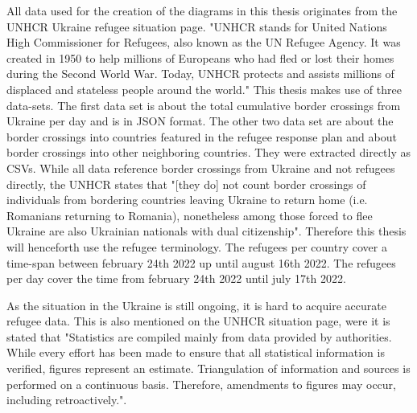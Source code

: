 All data used for the creation of the diagrams in this thesis originates from the UNHCR Ukraine refugee situation page\cite{unhcr}. "UNHCR stands for United Nations High Commissioner for Refugees, also known as the UN Refugee Agency. It was created in 1950 to help millions of Europeans who had fled or lost their homes during the Second World War. Today, UNHCR protects and assists millions of displaced and stateless people around the world."\cite{unhcr_what}
This thesis makes use of three data-sets. The first data set is about the total cumulative border crossings from Ukraine per day\cite{unhcr_rpd} and is in JSON format. The other two data set are about the border crossings into countries featured in the refugee response plan and about border crossings into other neighboring countries\cite{unhcr}. They were extracted directly as CSVs. While all data reference border crossings from Ukraine and not refugees directly, the UNHCR states that "[they do] not count border crossings of individuals from bordering countries leaving Ukraine to return home (i.e. Romanians returning to Romania), nonetheless among those forced to flee Ukraine are also Ukrainian nationals with dual citizenship"\cite{unhcr_note}. Therefore this thesis will henceforth use the refugee terminology.
The refugees per country cover a time-span between february 24th 2022 up until august 16th 2022\cite{unhcr}. The refugees per day cover the time from february 24th 2022 until july 17th 2022\cite{unhcr_rpd}.

As the situation in the Ukraine is still ongoing, it is hard to acquire accurate refugee data. This is also mentioned on the UNHCR situation page, were it is stated that "Statistics are compiled mainly from data provided by authorities. While every effort has been made to ensure that all statistical information is verified, figures represent an estimate. Triangulation of information and sources is performed on a continuous basis. Therefore, amendments to figures may occur, including retroactively."\cite{unhcr}.


